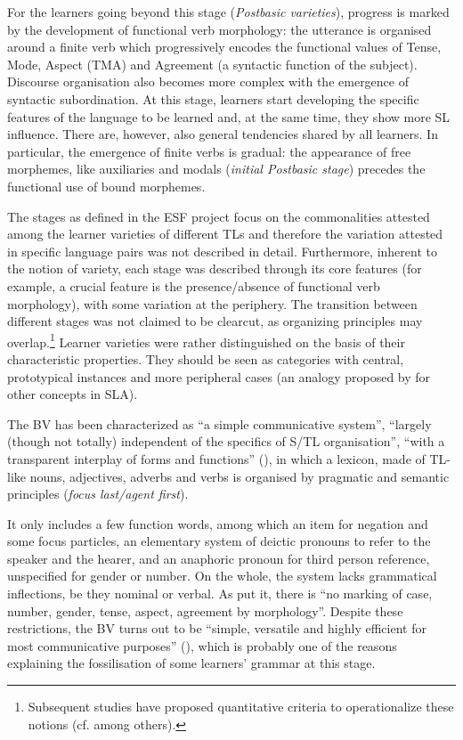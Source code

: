 \documentclass[output=paper]{langscibook}
\begin{document}
\begin{sloppypar}
For the learners going beyond this stage (\textit{Postbasic varieties}), progress is marked by the development of functional verb morphology: the utterance is organised around a finite verb which progressively encodes the functional values of Tense, Mode, Aspect (TMA) and Agreement (a syntactic function of the subject). Discourse organisation also becomes more complex with the emergence of syntactic subordination. At this stage, learners start developing the specific features of the language to be learned and, at the same time, they show more SL influence. There are, however, also general tendencies shared by all learners. In particular, the emergence of finite verbs is gradual: the appearance of free morphemes, like auxiliaries and modals (\textit{initial Postbasic stage}) precedes the functional use of bound morphemes.
\end{sloppypar}

The stages as defined in the ESF project focus on the commonalities attested among the learner varieties of different TLs and therefore the variation attested in specific language pairs was not described in detail. Furthermore, inherent to the notion of variety, each stage was described through its core features (for example, a crucial feature is the presence\slash absence of functional verb morphology), with some variation at the periphery. The transition between different stages was not claimed to be clearcut, as organizing principles may overlap.\footnote{Subsequent studies have proposed quantitative criteria to operationalize these notions (cf. \citealt{BartningSchlyter2004, Pallotti2007} among others).} Learner varieties were rather distinguished on the basis of their characteristic properties. They should be seen as categories with central, prototypical instances and more peripheral cases (an analogy proposed by \citealt{Berthele2021} for other concepts in SLA).

The BV has been characterized as “a simple communicative system”, “largely (though not totally) independent of the specifics of S/TL organisation”, “with a transparent interplay of forms and functions” (\citealt[303--304]{KleinPerdue1997}), in which a lexicon, made of TL-like nouns, adjectives, adverbs and verbs is organised by pragmatic and semantic principles (\textit{focus last/agent first}).

It only includes a few function words, among which an item for negation and some focus particles, an elementary system of deictic pronouns to refer to the speaker and the hearer, and an anaphoric pronoun for third person reference, unspecified for gender or number. On the whole, the system lacks grammatical inflections, be they nominal or verbal. As \citet[311]{KleinPerdue1997} put it, there is “no marking of case, number, gender, tense, aspect, agreement by morphology”. Despite these restrictions, the BV turns out to be “simple, versatile and highly efficient for most communicative purposes” (\citeyear[303]{KleinPerdue1997}), which is probably one of the reasons explaining the fossilisation of some learners’ grammar at this stage. 
\end{document}
